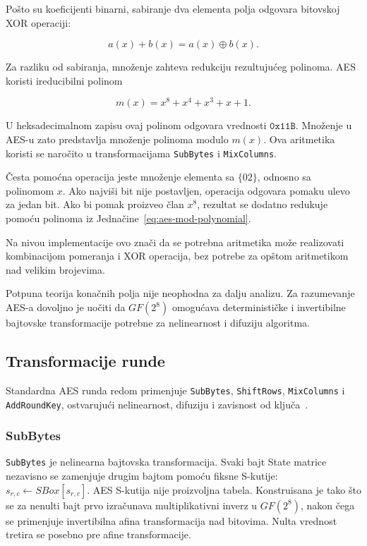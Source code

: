 Pošto su koeficijenti binarni, sabiranje dva elementa polja odgovara
bitovskoj XOR operaciji:

\begin{equation}
a(x)+b(x)=a(x)\oplus b(x).
\end{equation}

Za razliku od sabiranja, množenje zahteva redukciju rezultujućeg
polinoma. AES koristi ireducibilni polinom

\begin{equation}
m(x)=x^8+x^4+x^3+x+1.
\label{eq:aes-mod-polynomial}
\end{equation}

U heksadecimalnom zapisu ovaj polinom odgovara vrednosti
$\mathtt{0x11B}$.
Množenje u AES-u zato predstavlja množenje polinoma modulo $m(x)$.
Ova aritmetika koristi se naročito u transformacijama
\texttt{SubBytes} i \texttt{MixColumns}.

Česta pomoćna operacija jeste množenje elementa sa $\{02\}$, odnosno
sa polinomom $x$. Ako najviši bit nije postavljen, operacija odgovara
pomaku ulevo za jedan bit. Ako bi pomak proizveo član $x^8$, rezultat
se dodatno redukuje pomoću polinoma iz
Jednačine~\eqref{eq:aes-mod-polynomial}.

Na nivou implementacije ovo znači da se potrebna aritmetika može
realizovati kombinacijom pomeranja i XOR operacija, bez potrebe za
opštom aritmetikom nad velikim brojevima.

Potpuna teorija konačnih polja nije neophodna za dalju analizu. Za
razumevanje AES-a dovoljno je uočiti da $GF(2^8)$ omogućava
determinističke i invertibilne bajtovske transformacije potrebne za
nelinearnost i difuziju algoritma.


\subsection{Transformacije runde}
\label{subsec:aes_round}

Standardna AES runda redom primenjuje \texttt{SubBytes},
\texttt{ShiftRows}, \texttt{MixColumns} i \texttt{AddRoundKey},
ostvarujući nelinearnost, difuziju i zavisnost od ključa~\cite{fips197-2023}.

\subsubsection{SubBytes}

\texttt{SubBytes} je nelinearna bajtovska transformacija. Svaki bajt
State matrice nezavisno se zamenjuje drugim bajtom pomoću fiksne
S-kutije:
$s_{r,c} \leftarrow SBox[s_{r,c}]$.
AES S-kutija nije proizvoljna tabela. Konstruisana je tako što se za
nenulti bajt prvo izračunava multiplikativni inverz u $GF(2^8)$, nakon
čega se primenjuje invertibilna afina transformacija nad bitovima.
Nulta vrednost tretira se posebno pre afine transformacije.

